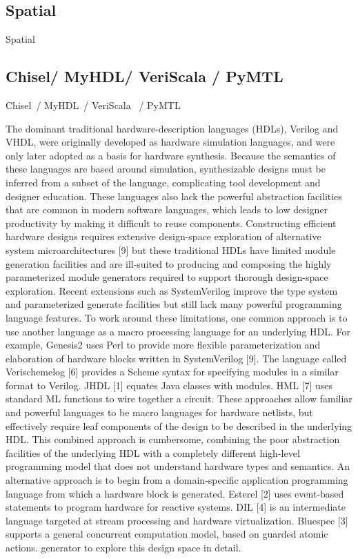 \subsection{Spatial}
Spatial~\cite{david_PLDI_2018_spatial, prabhakar_asplos_2016_parallelpattern}


\subsection{Chisel/ MyHDL/ VeriScala / PyMTL}
Chisel~\cite{bachrach_dac_2012_chisel}/ MyHDL~\cite{decaluwe_2004_myhdl}/ VeriScala~\cite{liu_2017_scala} / PyMTL~\cite{lockhart_ISCA_2014_pymtl}
%

The dominant traditional hardware-description languages
(HDLs), Verilog and VHDL, were originally developed as
hardware simulation languages, and were only later adopted
as a basis for hardware synthesis. Because the semantics of
these languages are based around simulation, synthesizable
designs must be inferred from a subset of the language, complicating tool development and designer education. These
languages also lack the powerful abstraction facilities that
are common in modern software languages, which leads to
low designer productivity by making it difficult to reuse components. Constructing efficient hardware designs requires
extensive design-space exploration of alternative system microarchitectures [9] but these traditional HDLs have limited
module generation facilities and are ill-suited to producing
and composing the highly parameterized module generators
required to support thorough design-space exploration. Recent extensions such as SystemVerilog improve the type system and parameterized generate facilities but still lack many
powerful programming language features.
To work around these limitations, one common approach
is to use another language as a macro processing language
for an underlying HDL. For example, Genesis2 uses Perl to
provide more flexible parameterization and elaboration of
hardware blocks written in SystemVerilog [9]. The language
called Verischemelog [6] provides a Scheme syntax for specifying modules in a similar format to Verilog. JHDL [1]
equates Java classes with modules. HML [7] uses standard
ML functions to wire together a circuit. These approaches
allow familiar and powerful languages to be macro languages
for hardware netlists, but effectively require leaf components
of the design to be described in the underlying HDL. This
combined approach is cumbersome, combining the poor abstraction facilities of the underlying HDL with a completely
different high-level programming model that does not understand hardware types and semantics.
An alternative approach is to begin from a domain-specific
application programming language from which a hardware
block is generated. Esterel [2] uses event-based statements
to program hardware for reactive systems. DIL [4] is an intermediate language targeted at stream processing and hardware virtualization. Bluespec [3] supports a general concurrent computation model, based on guarded atomic actions.
generator to explore this design space in detail.


